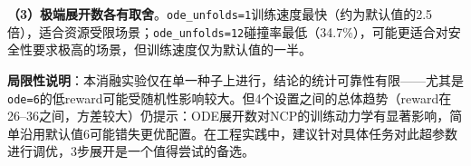 \textbf{（3）极端展开数各有取舍}。\texttt{ode\_unfolds=1}训练速度最快（约为默认值的2.5倍），适合资源受限场景；\texttt{ode\_unfolds=12}碰撞率最低（34.7\%），可能更适合对安全性要求极高的场景，但训练速度仅为默认值的一半。

\textbf{局限性说明}：本消融实验仅在单一种子上进行，结论的统计可靠性有限——尤其是\texttt{ode=6}的低reward可能受随机性影响较大。但4个设置之间的总体趋势（reward在26--36之间，方差较大）仍提示：ODE展开数对NCP的训练动力学有显著影响，简单沿用默认值6可能错失更优配置。在工程实践中，建议针对具体任务对此超参数进行调优，3步展开是一个值得尝试的备选。

